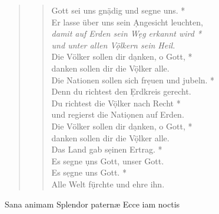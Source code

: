 \def\greinitialformat#1{{\fontsize{40}{40}\selectfont #1}}
\gresetfirstlineaboveinitial{\small \textcolor{red}{Ps 67}}{}
\setaboveinitialseparation{0.72mm}


\vspace{0.3cm}
\begin{quote}
 
\begin{verse}
 Gott sei uns gn\d ädig und segne uns.  *\\ 
Er lasse über uns sein \d Angesicht leuchten,\\ \vin
\textit{damit auf Erden sein W\d eg erkannt wird *\\ \vin 
und unter allen V\d ölkern sein Heil.}\\ 
Die Völker sollen dir d\d anken, o Gott, *\\ 
danken sollen dir die V\d ölker alle.\\ \vin 
Die Nationen sollen sich fr\d euen und jubeln. *\\ \vin 
Denn du richtest den \d Erdkreis gerecht.\\  
Du richtest die V\d ölker nach Recht *\\  
und regierst die Nati\d onen auf Erden.\\ \vin  
Die Völker sollen dir d\d anken, o Gott, *\\ \vin 
danken sollen dir die V\d ölker alle.\\ 
Das Land gab s\d einen Ertrag.  *\\ 
Es segne \d uns Gott, unser Gott.\\ \vin  
Es s\d egne uns Gott.  *\\ \vin 
Alle Welt f\d ürchte und ehre ihn.\\  


\end{verse}
\end{quote}

\noindent{} Sana animam  Splendor paternæ  Ecce iam noctis \\
\begin{flushleft}


\medskip

{\rm{
}}
\end{flushleft}

